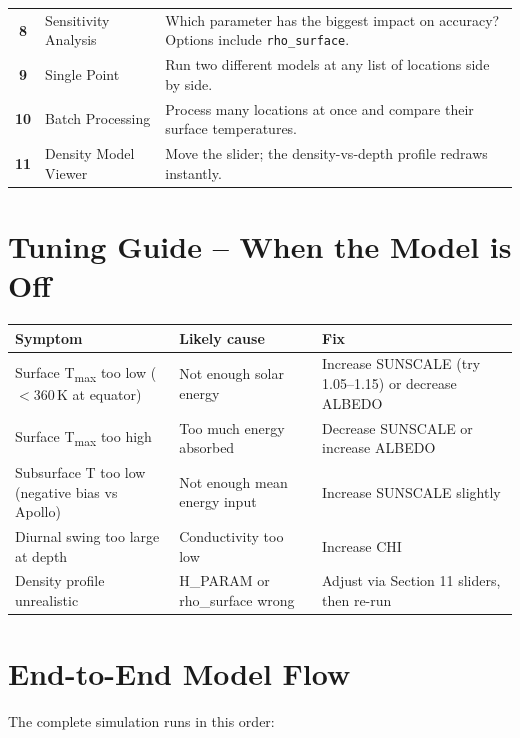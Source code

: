 \documentclass[12pt, a4paper]{article}
\begin{document}
\begin{center}
\begin{tabular}{>{\bfseries}c l p{8.2cm}}
8  & Sensitivity Analysis  & Which parameter has the biggest impact on accuracy? Options include \texttt{rho\_surface}. \\
9  & Single Point          & Run two different models at any list of locations side by side. \\
10 & Batch Processing      & Process many locations at once and compare their surface temperatures. \\
11 & Density Model Viewer  & Move the slider; the density-vs-depth profile redraws instantly. \\
\bottomrule
\end{tabular}
\end{center}

\section{Tuning Guide -- When the Model is Off}

\begin{center}
\renewcommand{\arraystretch}{1.3}
\begin{tabular}{p{4.5cm} p{4.5cm} p{4.5cm}}
\toprule
\textbf{Symptom} & \textbf{Likely cause} & \textbf{Fix} \\
\midrule
Surface T\textsubscript{max} too low ($<$360\,K at equator) &
  Not enough solar energy &
  Increase SUNSCALE (try 1.05--1.15) or decrease ALBEDO \\
Surface T\textsubscript{max} too high &
  Too much energy absorbed &
  Decrease SUNSCALE or increase ALBEDO \\
Subsurface T too low (negative bias vs Apollo) &
  Not enough mean energy input &
  Increase SUNSCALE slightly \\
Diurnal swing too large at depth &
  Conductivity too low &
  Increase CHI \\
Density profile unrealistic &
  H\_PARAM or rho\_surface wrong &
  Adjust via Section 11 sliders, then re-run \\
\bottomrule
\end{tabular}
\end{center}

\section{End-to-End Model Flow}

The complete simulation runs in this order:
\end{document}
